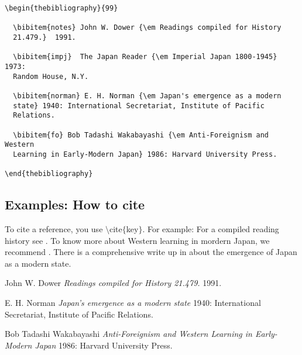 \documentclass[12pt,a4paper]{article}
\begin{document}
\begin{verbatim}
\begin{thebibliography}{99}

  \bibitem{notes} John W. Dower {\em Readings compiled for History
  21.479.}  1991.

  \bibitem{impj}  The Japan Reader {\em Imperial Japan 1800-1945} 1973:
  Random House, N.Y.

  \bibitem{norman} E. H. Norman {\em Japan's emergence as a modern
  state} 1940: International Secretariat, Institute of Pacific
  Relations.

  \bibitem{fo} Bob Tadashi Wakabayashi {\em Anti-Foreignism and Western
  Learning in Early-Modern Japan} 1986: Harvard University Press.

\end{thebibliography}
\end{verbatim}

\subsection{Examples: How to cite}
To cite a reference, you use  $\setminus$cite$\{$key$\}$. For example: For a compiled reading history see \cite{notes}. To know more about Western learning in mordern Japan, we recommend \cite{fo, notes}. There is a comprehensive write up in \cite{norman} about the emergence of Japan as a modern state.

\newpage
\begin{thebibliography}{99}

   John W. Dower {\em Readings compiled for History
  21.479.}  1991.
  
   E. H. Norman {\em Japan's emergence as a modern
  state} 1940: International Secretariat, Institute of Pacific
  Relations.

   Bob Tadashi Wakabayashi {\em Anti-Foreignism and Western Learning in Early-Modern Japan} 1986: Harvard University Press.
\end{thebibliography}
\end{document}
